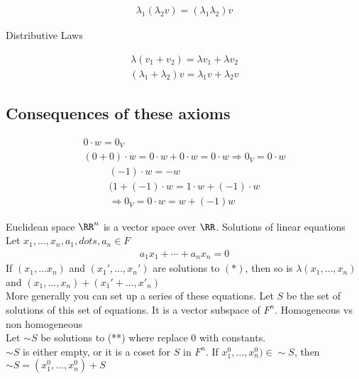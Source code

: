 \documentclass[class=scrartcl, crop=false]{standalone}
\begin{document}
\begin{definition}
\begin{enumerate}
\begin{enumerate}
\begin{gather*}
        \lambda_1(\lambda_2 v) = (\lambda_1\lambda_2)v
      \end{gather*} 
    \end{enumerate} 
    \ii
    Distributive Laws
    \begin{enumerate}
      \ii
      \begin{gather*}
        \lambda(v_1 + v_2) = \lambda v_1 + \lambda v_2
      \end{gather*} 
      \ii
      \begin{gather*}
        (\lambda_1 + \lambda_2)v = \lambda_1 v + \lambda_2 v
      \end{gather*} 
    \end{enumerate} 
  \end{enumerate} 
\end{definition} 

\subsection{Consequences of these axioms}

\begin{enumerate}
  \ii
  \begin{gather*}
    0 \cdot w = 0_V \\
    (0 + 0) \cdot w = 0 \cdot w + 0 \cdot w = 0 \cdot w \Rightarrow 0_V = 0 \cdot w
  \end{gather*} 
  \ii
  \begin{gather*}
    (-1) \cdot w = -w \\
    (1 + (-1) \cdot w = 1 \cdot w + (-1) \cdot w \\
    \Rightarrow 0_V = 0 \cdot w = w + (-1)w
  \end{gather*} 
\end{enumerate} 

\begin{example}
  \begin{enumerate}
    \ii
    Euclidean space $\RR^n$ is a vector space over $\RR$.
    \ii
    Solutions of linear equations
    \\
    Let $x_1, \dots, x_n, a_1, dots, a_n \in F$
    \\
    \begin{gather*}
      a_1x_1 + \cdots + a_nx_n = 0
    \end{gather*} 
    If $(x_1, \dots x_n)$ and $(x_1', \dots, x_n')$ are solutions to $(*)$, then so is $\lambda(x_1, \dots, x_n)$ and $(x_1, \dots, x_n) + (x_1' + \dots, x'_n)$
    \\
    More generally you can set up a series of these equations. Let $S$ be the set of solutions of this set of equations. It is a vector subspace of  $F^n$. Homogeneous vs non homogeneous
    \\
    Let $\sim{S}$ be solutions to (**) where replace 0 with constants.
    \\
    $\sim{S}$ is either empty, or it is a coset for $S$ in $F^n$. If $x_1^0, \dots, x_n^0) \in \sim{S}$, then $\sim{S} = (x_1^0, \dots, x_n^0) + S$
  \end{enumerate} 
\end{example} 
\end{document}
